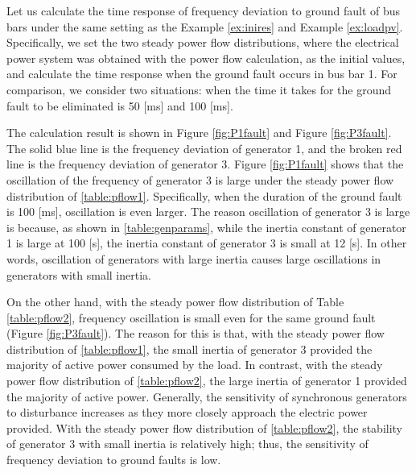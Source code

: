 \documentclass[graybox, envcountchap]{svmult}
\begin{document}
\begin{example}\label{ex:busflt}
Let us calculate the time response of frequency deviation to ground fault of bus bars under the same setting as the Example \ref{ex:inires} and Example \ref{ex:loadpv}.
Specifically, we set the two steady power flow distributions, where the electrical power system was obtained with the power flow calculation, as the initial values, and calculate the time response when the ground fault occurs in bus bar 1.
For comparison, we consider two situations: when the time it takes for the ground fault to be eliminated is 50 [ms] and 100 [ms]. 

The calculation result is shown in Figure \ref{fig:P1fault} and Figure \ref{fig:P3fault}. The solid blue line is the frequency deviation of generator 1, and the broken red line is the frequency deviation of generator 3.
Figure \ref{fig:P1fault} shows that the oscillation of the frequency of generator 3 is large under the steady power flow distribution of \ref{table:pflow1}.
Specifically, when the duration of the ground fault is 100 [ms], oscillation is even larger. The reason oscillation of generator 3 is large is because, as shown in \ref{table:genparams}, while the inertia constant of generator 1 is large at 100 [s], the inertia constant of generator 3 is small at 12 [s].
In other words, oscillation of generators with large inertia causes large oscillations in generators with small inertia.

On the other hand, with the steady power flow distribution of Table \ref{table:pflow2}, frequency oscillation is small even for the same ground fault (Figure \ref{fig:P3fault}).
The reason for this is that, with the steady power flow distribution of \ref{table:pflow1}, the small inertia of generator 3 provided the majority of active power consumed by the load.
In contrast, with the steady power flow distribution of \ref{table:pflow2}, the large inertia of generator 1 provided the majority of active power.
Generally, the sensitivity of synchronous generators to disturbance increases as they more closely approach the electric power provided.
With the steady power flow distribution of \ref{table:pflow2}, the stability of generator 3 with small inertia is relatively high; thus, the sensitivity of frequency deviation to ground faults is low.
\end{example}
\end{document}
